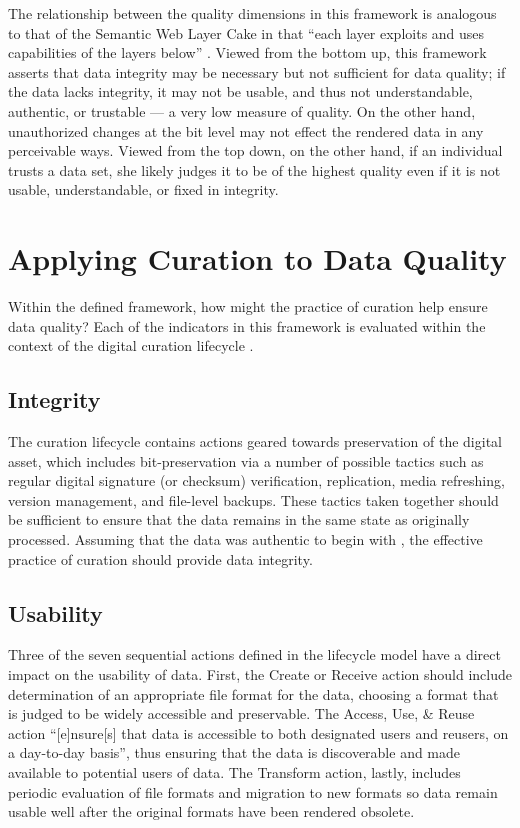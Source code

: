\documentclass[man,12pt,biblatex]{apa6}
\begin{document}
The relationship between the quality dimensions in this framework is
analogous to that of the Semantic Web Layer Cake in that ``each layer
exploits and uses capabilities of the layers below''
\parencite{wiki:semweb}. Viewed from the bottom up, this framework asserts
that data integrity may be necessary but not sufficient for data
quality; if the data lacks integrity, it may not be usable, and thus
not understandable, authentic, or trustable --- a very low measure of
quality. On the other hand, unauthorized changes at the bit level may
not effect the rendered data in any perceivable ways. Viewed from the
top down, on the other hand, if an individual trusts a data set, she
likely judges it to be of the highest quality even if it is not
usable, understandable, or fixed in integrity.

\section{Applying Curation to Data Quality}

Within the defined framework, how might the practice of curation help
ensure data quality? Each of the indicators in this framework is
evaluated within the context of the digital curation lifecycle
\parencite{dcc:lifecycle}.

\subsection{Integrity}

The curation lifecycle contains actions geared towards preservation of
the digital asset, which includes bit-preservation via a number of
possible tactics such as regular digital signature (or checksum)
verification, replication, media refreshing, version management, and
file-level backups. These tactics taken together should be sufficient
to ensure that the data remains in the same state as originally
processed. Assuming that the data was authentic to begin with
, the
effective practice of curation should provide data integrity.

\subsection{Usability}

Three of the seven sequential actions defined in the lifecycle model
have a direct impact on the usability of data. First, the Create or
Receive action  should include determination of an
appropriate file format for the data, choosing a format that is judged
to be widely accessible and preservable. The Access, Use, \& Reuse
action ``[e]nsure[s] that data is accessible to both designated users
and reusers, on a day-to-day basis'', thus ensuring that the data is
discoverable and made available to potential users of data. The
Transform action, lastly, includes periodic evaluation of file formats
and migration to new formats so data remain usable well after the
original formats have been rendered obsolete.
\end{document}
